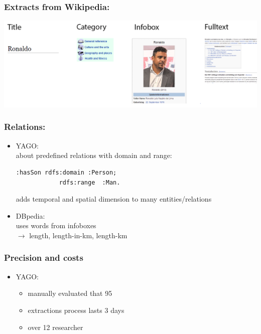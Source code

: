 \begin{frame}
\frametitle{Extracts from Wikipedia:}
\includegraphics[scale=0.25]{img/yago-figure3.png}
\end{frame}

\begin{frame}[fragile]
\frametitle{Relations:}
\begin{itemize}
\item YAGO:\\
about predefined relations with domain and range:\\
\begin{lstlisting}[frame=single]
:hasSon rdfs:domain :Person;
            rdfs:range  :Man.
\end{lstlisting}
adds temporal and spatial dimension to many entities/relations
\item DBpedia:\\
uses words from infoboxes\\
$\rightarrow$ length, length-in-km, length-km
\end{itemize}
\end{frame}

\begin{frame}
\frametitle{Precision and costs}
\begin{itemize}
\item YAGO:
\begin{itemize}
\item manually evaluated that 95%
\item extractions process lasts 3 days
\item over 12 researcher
\end{itemize}
\end{itemize}
\end{frame}

